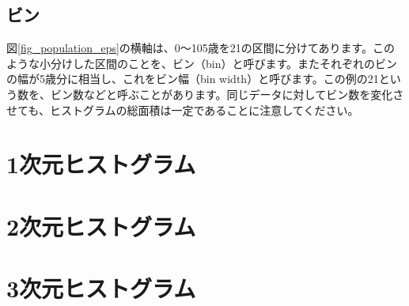 \subsection{ビン}

図\ref{fig_population_eps}の横軸は、0〜105歳を21の区間に分けてあります。このような小分けした区間のことを、ビン（bin）と呼びます。またそれぞれのビンの幅が5歳分に相当し、これをビン幅（bin width）と呼びます。この例の21という数を、ビン数などと呼ぶことがあります。同じデータに対してビン数を変化させても、ヒストグラムの総面積は一定であることに注意してください。

\begin{NoFloat}

\end{NoFloat}

\section{1次元ヒストグラム}


\section{2次元ヒストグラム}

\section{3次元ヒストグラム}
